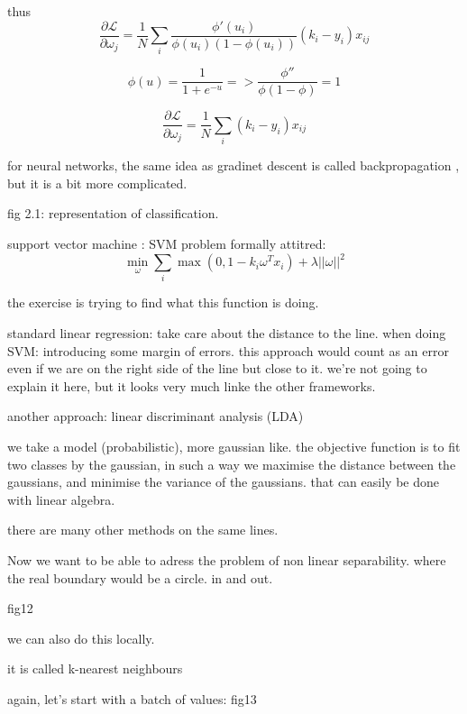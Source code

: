 \documentclass[a4paper]{tufte-book}
\begin{document}
thus
\begin{equation}
    \frac{\partial \mathcal{L}}{\partial\omega_j} = \frac{1}{N} \sum_i \frac{\phi'(u_i)}{\phi(u_i) (1-\phi(u_i))} (k_i - y_i) x_{ij}
\end{equation}

\begin{equation}
    \phi (u) = \frac{1}{1+e^{-u}} => \frac{\phi''}{\phi (1-\phi)} = 1
\end{equation}

\begin{equation}
    \frac{\partial \mathcal{L}}{\partial \omega_j} = \frac{1}{N} \sum_i (k_i - y_i) x_{ij}
\end{equation}

for neural networks, the same idea as gradinet descent is called backpropagation
, but it is a bit more complicated.

fig 2.1: representation of classification.

support vector machine : SVM
problem formally attitred: 
\begin{equation}
    \min_\omega \sum_i \max(0,1-k_i \omega^T x_i ) + \lambda ||\omega||^2
\end{equation}

the exercise is trying to find what this function is doing.

standard linear regression: take care about the distance to the line.
when doing SVM: introducing some margin of errors.
this approach would count as an error even if we are on the right side of the
line but close to it.
we're not going to explain it here, but it looks very much linke the other frameworks.

another approach:
linear discriminant analysis (LDA)

we take a model (probabilistic), more gaussian like. the objective function is
to fit two classes by the gaussian, in such a way we maximise the distance
between the gaussians, and minimise the variance of the gaussians.
that can easily be done with linear algebra.

there are many other methods on the same lines.

Now we want to be able to adress the problem of non linear separability.
where the real boundary would be a circle.
in and out.

fig12

we can also do this locally.

it is called k-nearest neighbours

again, let's start with a batch of values:
fig13
\end{document}
